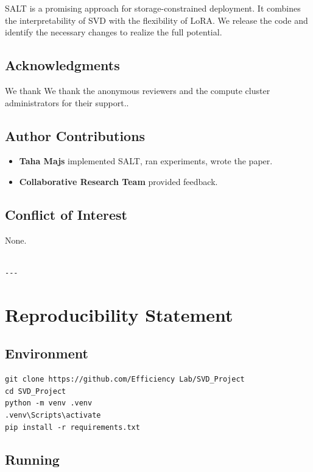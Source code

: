 SALT is a promising approach for storage-constrained deployment. It combines 
the interpretability of SVD with the flexibility of LoRA. We release the 
code and identify the necessary changes to realize the full potential.

\subsection{Acknowledgments}

We thank We thank the anonymous reviewers and the compute cluster administrators for their support..

\subsection{Author Contributions}

\begin{itemize}
\item \textbf{Taha Majs} implemented SALT, ran experiments, wrote the paper.
\item \textbf{Collaborative Research Team} provided feedback.

\end{itemize}
\subsection{Conflict of Interest}

None.
\begin{lstlisting}

---
\end{lstlisting}


\section{Reproducibility Statement}

\subsection{Environment}

\begin{lstlisting}
git clone https://github.com/Efficiency Lab/SVD_Project
cd SVD_Project
python -m venv .venv
.venv\Scripts\activate
pip install -r requirements.txt
\end{lstlisting}

\subsection{Running}

